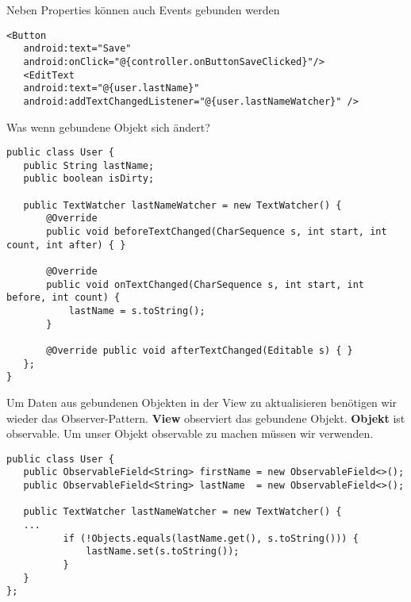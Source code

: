 Neben Properties können auch Events gebunden werden
\begin{lstlisting}
<Button
   android:text="Save"
   android:onClick="@{controller.onButtonSaveClicked}"/>
   <EditText
   android:text="@{user.lastName}"
   android:addTextChangedListener="@{user.lastNameWatcher}" />
\end{lstlisting}
Was wenn gebundene Objekt sich ändert?
\begin{lstlisting}
public class User {
   public String lastName;
   public boolean isDirty;
  
   public TextWatcher lastNameWatcher = new TextWatcher() {
       @Override
       public void beforeTextChanged(CharSequence s, int start, int count, int after) { }

       @Override
       public void onTextChanged(CharSequence s, int start, int before, int count) {
           lastName = s.toString();
       }

       @Override public void afterTextChanged(Editable s) { }
   };
}
\end{lstlisting}
Um Daten aus gebundenen Objekten in der View zu aktualisieren benötigen wir wieder das Observer-Pattern. \textbf{View} observiert das gebundene Objekt. \textbf{Objekt} ist observable. Um unser Objekt observable zu machen müssen wir  verwenden.
\begin{lstlisting}
public class User {
   public ObservableField<String> firstName = new ObservableField<>();
   public ObservableField<String> lastName  = new ObservableField<>();

   public TextWatcher lastNameWatcher = new TextWatcher() {
   ...
          if (!Objects.equals(lastName.get(), s.toString())) {
              lastName.set(s.toString());
          }
   }
};
\end{lstlisting}